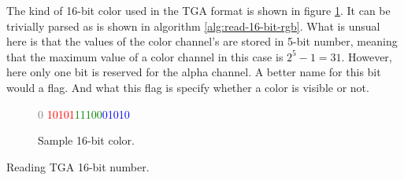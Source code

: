 \begin{refsection}
  The kind of 16-bit color used in the TGA format is shown in figure
  \ref{fig:tga-16-bit-colors-bits}. It can be trivially parsed as is
  shown in algorithm \ref{alg:read-16-bit-rgb}. What is unsual here is
  that the values of the color channel's are stored in 5-bit number,
  meaning that the maximum value of a color channel in this case is
  $2^5 - 1 = 31$. However, here only one bit is reserved for the alpha
  channel. A better name for this bit would a flag. And what this flag
  is specify whether a color is visible or not.

  \begin{figure}
    \centering
    {\huge\textcolor{gray}{0}%
      \textcolor{red}{10101}\textcolor{green}{11100}\textcolor{blue}{01010}}
    \caption{Sample 16-bit color.}
    \label{fig:tga-16-bit-colors-bits}
  \end{figure}


  \begin{algorithm}[H]
    \caption{Reading TGA 16-bit number.}
    \label{alg:read-16-bit-rgb}
    \begin{algorithmic}[1]
    \end{algorithmic}
  \end{algorithm}

  \printbibliography[heading=subbibliography]
\end{refsection}
